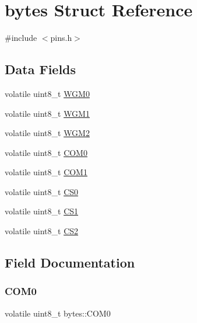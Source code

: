 \hypertarget{structbytes}{}\section{bytes Struct Reference}
\label{structbytes}


{\ttfamily \#include $<$pins.\+h$>$}

\subsection*{Data Fields}
\begin{DoxyCompactItemize}
\item 
volatile uint8\+\_\+t \mbox{\hyperlink{structbytes_a69a3e427eeac275f14818644d6d806fb}{W\+G\+M0}}
\item 
volatile uint8\+\_\+t \mbox{\hyperlink{structbytes_af1e463676e0734974e6d8aa648e40b74}{W\+G\+M1}}
\item 
volatile uint8\+\_\+t \mbox{\hyperlink{structbytes_a89629be7fefa4977a3caa8f221b91054}{W\+G\+M2}}
\item 
volatile uint8\+\_\+t \mbox{\hyperlink{structbytes_a5f42fc6762a8162a52f073984fa74475}{C\+O\+M0}}
\item 
volatile uint8\+\_\+t \mbox{\hyperlink{structbytes_a1be49f4571e2a14a90ea0e9b8dd71077}{C\+O\+M1}}
\item 
volatile uint8\+\_\+t \mbox{\hyperlink{structbytes_aefb315f54dda666e96e5362f083e0a09}{C\+S0}}
\item 
volatile uint8\+\_\+t \mbox{\hyperlink{structbytes_a7ce7046f62128725893863cf6c815c80}{C\+S1}}
\item 
volatile uint8\+\_\+t \mbox{\hyperlink{structbytes_a7f68d701243233c6136cc42a74a9139a}{C\+S2}}
\end{DoxyCompactItemize}


\subsection{Field Documentation}
\mbox{\label{structbytes_a5f42fc6762a8162a52f073984fa74475}} 
\subsubsection{\texorpdfstring{C\+O\+M0}{COM0}}
{\footnotesize\ttfamily volatile uint8\+\_\+t bytes\+::\+C\+O\+M0}

\mbox{\label{structbytes_a1be49f4571e2a14a90ea0e9b8dd71077}} 

